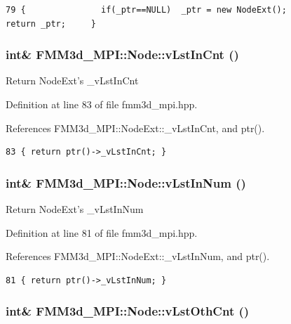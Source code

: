 \footnotesize\begin{verbatim}79 {               if(_ptr==NULL)  _ptr = new NodeExt();           return _ptr;     }
\end{verbatim}\normalsize 


\subsubsection{\setlength{\rightskip}{0pt plus 5cm}int\& FMM3d\_\-MPI::Node::v\-Lst\-In\-Cnt ()\hspace{0.3cm}{\tt  [inline]}}\label{classFMM3d__MPI_1_1Node_84a73562a26ac46cdd85378ccfcca3ed_84a73562a26ac46cdd85378ccfcca3ed}


Return Node\-Ext's \_\-v\-Lst\-In\-Cnt 

Definition at line 83 of file fmm3d\_\-mpi.hpp.

References FMM3d\_\-MPI::Node\-Ext::\_\-v\-Lst\-In\-Cnt, and ptr().

\footnotesize\begin{verbatim}83 { return ptr()->_vLstInCnt; }
\end{verbatim}\normalsize 


\subsubsection{\setlength{\rightskip}{0pt plus 5cm}int\& FMM3d\_\-MPI::Node::v\-Lst\-In\-Num ()\hspace{0.3cm}{\tt  [inline]}}\label{classFMM3d__MPI_1_1Node_7c3e23878d30b7839894a7a34ad44473_7c3e23878d30b7839894a7a34ad44473}


Return Node\-Ext's \_\-v\-Lst\-In\-Num 

Definition at line 81 of file fmm3d\_\-mpi.hpp.

References FMM3d\_\-MPI::Node\-Ext::\_\-v\-Lst\-In\-Num, and ptr().

\footnotesize\begin{verbatim}81 { return ptr()->_vLstInNum; }
\end{verbatim}\normalsize 


\subsubsection{\setlength{\rightskip}{0pt plus 5cm}int\& FMM3d\_\-MPI::Node::v\-Lst\-Oth\-Cnt ()\hspace{0.3cm}{\tt  [inline]}}\label{classFMM3d__MPI_1_1Node_6704cf9428cd075a2f78a5dff30a4f8e_6704cf9428cd075a2f78a5dff30a4f8e}


